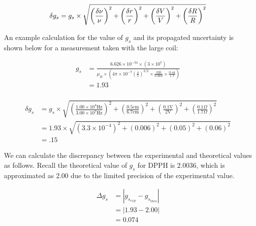 \documentclass[a4paper]{article}
\begin{document}
\begin{equation}
\label{eq:delta_gs}
\delta g_s = g_s \times
              \sqrt {
              		  \left( \frac{\delta \nu}{\nu} \right) ^2
              		+ \left( \frac{\delta r}{r} \right) ^2
              		+ \left( \frac{\delta V}{V} \right) ^2
              		+ \left( \frac{\delta R}{R} \right) ^2
					} \\
\end{equation}

An example calculation for the value of $g_s$ and its propagated
uncertainty is shown below for a measurement taken with the large
coil:

\begin{align*}
g_s &= \frac
		{6.626 \times 10^{-34} \times  \left( 3 \times 10^7 \right) }
		{\mu_B \times \left( 4 \pi \times 10^{-7}
						     \left( \frac{4}{5} \right) ^{3/2}
						     \times \frac{320}{0.068}
						     \times \frac{0.44}{1.7} \right)
	     } \\
    &= 1.93 \\
\end{align*}

\begin{align*}
\delta g_s &=
		   g_s \times
              \sqrt {
              		  \left( \frac{1.00 \times 10^4 \text{Hz}}{3.00 \times 10^7 \text{Hz}} \right) ^2
              		+ \left( \frac{0.5 \text{cm}}{6.7 \text{cm}} \right) ^2
              		+ \left( \frac{0.1 \text{V}}{2 \text{V}} \right) ^2
              		+ \left( \frac{0.1 \Omega}{1.7 \Omega} \right) ^2
					} \\
		  &= 1.93 \times
              \sqrt {
              		  \left( 3.3 \times 10^{-4} \right) ^2
              		+ \left( 0.006 \right) ^2
              		+ \left( 0.05 \right) ^2
              		+ \left( 0.06 \right) ^2
					} \\
		  &= .15
\end{align*}

We can calculate the discrepancy between the experimental and
theoretical values as follows. Recall the theoretical value of $g_s$
for DPPH is 2.0036, which is approximated as 2.00 due to the limited
precision of the experimental value.


\begin{align*}
\Delta g_s &= | g_{s_{exp}} - g_{s_{theo}} | \\ &= | 1.93 - 2.00 |
\\ &= 0.074 \\
\end{align*}
\end{document}
